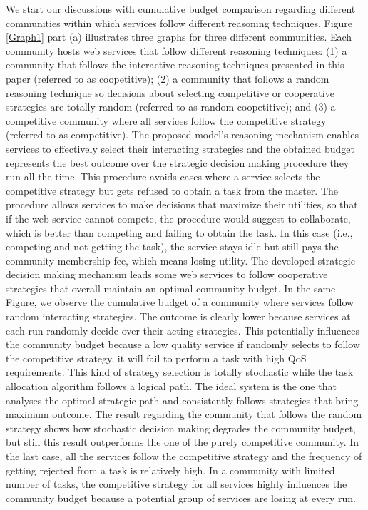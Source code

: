 \documentclass[runningheads,a4paper]{llncs}
\begin{document}
We start our discussions with cumulative budget comparison
regarding different communities within which services follow
different reasoning techniques. Figure \ref{Graph1} part (a)
illustrates three graphs for three different communities. Each
community hosts web services that follow different reasoning
techniques: (1) a community that follows the interactive reasoning
techniques presented in this paper (referred to as coopetitive);
(2) a community that follows a random reasoning technique so
decisions about selecting competitive or cooperative strategies
are totally random (referred to as random coopetitive); and (3) a
competitive community where all services follow the competitive
strategy (referred to as competitive). The proposed model's
reasoning mechanism enables services to effectively select their
interacting strategies and the obtained budget represents the best
outcome over the strategic decision making procedure they run all
the time. This procedure avoids cases where a service selects the
competitive strategy but gets refused to obtain a task from the
master. The procedure allows services to make decisions that
maximize their utilities, so that if the web service cannot
compete, the procedure would suggest to collaborate, which is
better than competing and failing to obtain the task. In this case
(i.e., competing and not getting the task), the service stays idle
but still pays the community membership fee, which means losing
utility. The developed strategic decision making mechanism leads
some web services to follow cooperative strategies that overall
maintain an optimal community budget. In the same Figure, we
observe the cumulative budget of a community where services follow
random interacting strategies. The outcome is clearly lower
because services at each run randomly decide over their acting
strategies. This potentially influences the community budget
because a low quality service if randomly selects to follow the
competitive strategy, it will fail to perform a task with high QoS requirements. This kind of
strategy selection is totally stochastic while the task allocation
algorithm follows a logical path. The ideal system is the one that
analyses the optimal strategic path and consistently follows
strategies that bring maximum outcome. The result regarding the
community that follows the random strategy shows how stochastic
decision making degrades the community budget, but still this
result outperforms the one of the purely competitive community. In
the last case, all the services follow the competitive strategy
and the frequency of getting rejected from a task is relatively
high. In a community with limited number of tasks, the competitive
strategy for all services highly influences the community budget
because a potential group of services are losing at every run.
\end{document}
